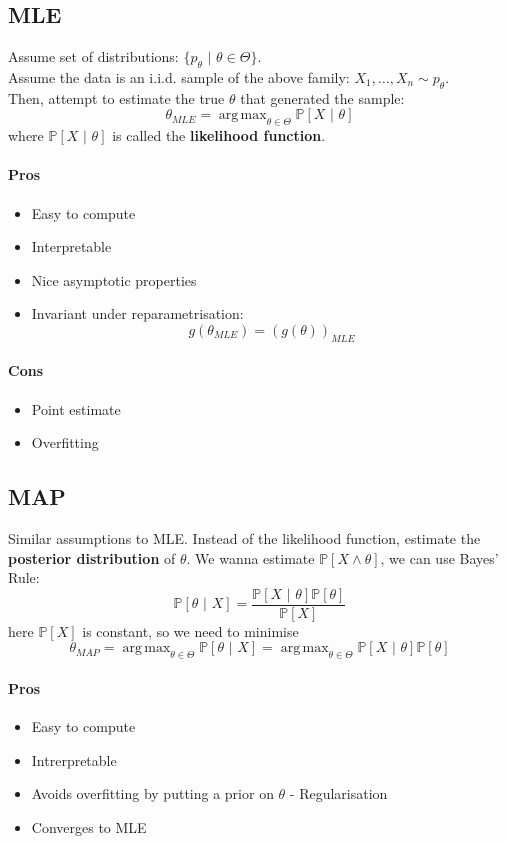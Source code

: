\documentclass{article}
\renewcommand{\|}{\,\,|\,\,}
\newcommand{\Prob}{\mathbb{P}}
\DeclareMathOperator*{\argmax}{arg\,max}
\begin{document}
\subsection{MLE}
Assume set of distributions: $\{p_\theta \| \theta \in \Theta \}$. \\
Assume the data is an i.i.d. sample of the above family: $X_1, \hdots, X_n \sim
p_\theta$.\\
Then, attempt to estimate the true $\theta$ that generated the sample:
\[
  \theta_{MLE} = \argmax_{\theta \in \Theta} \Prob [ X \| \theta ]
\]
where $\Prob[ X \| \theta]$ is called the \textbf{likelihood function}.
\paragraph{Pros}
\begin{itemize}
\item Easy to compute
\item Interpretable
\item Nice asymptotic properties
\item Invariant under reparametrisation:
  \[
    g(\theta_{MLE}) = (g(\theta))_{MLE}
  \]
\end{itemize}
\paragraph{Cons}
\begin{itemize}
\item Point estimate
\item Overfitting
\end{itemize}
\subsection{MAP}
Similar assumptions to MLE.
Instead of the likelihood function, estimate the \textbf{posterior distribution}
of $\theta$. We wanna estimate $\Prob[X \land \theta]$, we can use Bayes' Rule:
\[
  \Prob[\theta \| X] = \frac{\Prob[X \| \theta] \Prob[\theta]}{\Prob[X]}
\]
here $\Prob[X]$ is constant, so we need to minimise
\[
  \theta_{MAP} = \argmax_{\theta \in \Theta} \Prob[\theta \| X] = \argmax_{\theta \in \Theta}\Prob[X \| \theta] \Prob[\theta]
\]
\paragraph{Pros}
\begin{itemize}
\item Easy to compute
\item Intrerpretable
\item Avoids overfitting by putting a prior on $\theta$ - Regularisation
\item Converges to MLE
\end{itemize}
\end{document}
